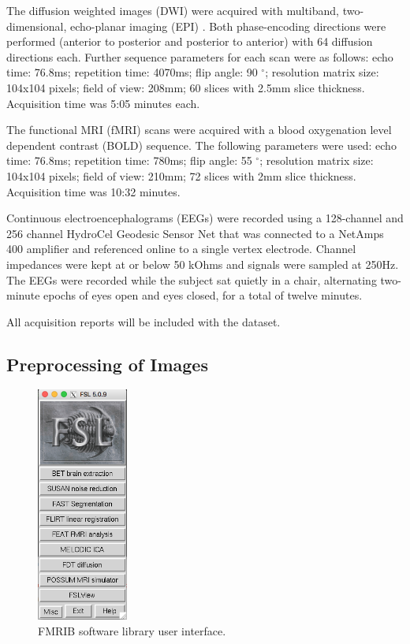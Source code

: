 The diffusion weighted images (DWI) were acquired with multiband, two-dimensional, echo-planar imaging (EPI) \cite{ref:epi}. Both phase-encoding directions were performed (anterior to posterior and posterior to anterior) with 64 diffusion directions each. Further sequence parameters for each scan were as follows: echo time: 76.8ms; repetition time: 4070ms; flip angle: 90 $^{\circ}$; resolution matrix size: 104x104 pixels; field of view: 208mm; 60 slices with 2.5mm slice thickness. Acquisition time was 5:05 minutes each.

The functional MRI (fMRI) scans were acquired with a blood oxygenation level dependent contrast (BOLD) sequence. The following parameters were used: echo time: 76.8ms; repetition time: 780ms; flip angle: 55 $^{\circ}$; resolution matrix size: 104x104 pixels; field of view: 210mm; 72 slices with 2mm slice thickness. Acquisition time was 10:32 minutes.

Continuous electroencephalograms (EEGs) were recorded using a 128-channel and 256 channel HydroCel Geodesic Sensor Net that was connected to a NetAmps 400 amplifier and referenced online to a single vertex electrode. Channel impedances were kept at or below 50 kOhms and signals were sampled at 250Hz. The EEGs were recorded while the subject sat quietly in a chair, alternating two-minute epochs of eyes open and eyes closed, for a total of twelve minutes.

All acquisition reports will be included with the dataset.

\subsection{Preprocessing of Images}
\label{sec:preprocess}

\begin{figure}
    \centering
    \vspace{-63pt}
    \includegraphics[width=3cm]{Figures/FSL}
    \caption{FMRIB software library user interface.}
    \label{fig:fsl}
\end{figure}

